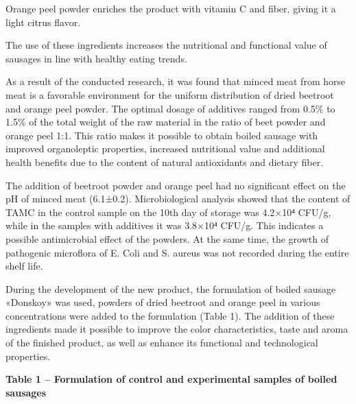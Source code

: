 \begin{multicols}{2}
Orange peel powder enriches the product with vitamin C and fiber, giving
it a light citrus flavor.

The use of these ingredients increases the nutritional and functional
value of sausages in line with healthy eating trends.

As a result of the conducted research, it was found that minced meat
from horse meat is a favorable environment for the uniform distribution
of dried beetroot and orange peel powder. The optimal dosage of
additives ranged from 0.5\% to 1.5\% of the total weight of the raw
material in the ratio of beet powder and orange peel 1:1. This ratio
makes it possible to obtain boiled sausage with improved organoleptic
properties, increased nutritional value and additional health benefits
due to the content of natural antioxidants and dietary fiber.

The addition of beetroot powder and orange peel had no significant
effect on the pH of minced meat (6.1±0.2). Microbiological analysis
showed that the content of TAMC in the control sample on the 10th day of
storage was 4.2×10⁴ CFU/g, while in the samples with additives it was
3.8×10⁴ CFU/g. This indicates a possible antimicrobial effect of the
powders. At the same time, the growth of pathogenic microflora of E.
Coli and S. aureus was not recorded during the entire shelf life.

During the development of the new product, the formulation of boiled
sausage «Donskoy» was used, powders of dried beetroot and orange peel in
various concentrations were added to the formulation (Table 1). The
addition of these ingredients made it possible to improve the color
characteristics, taste and aroma of the finished product, as well as
enhance its functional and technological properties.
\end{multicols}

{\bfseries Table 1 -- Formulation of control and experimental samples of boiled sausages}

